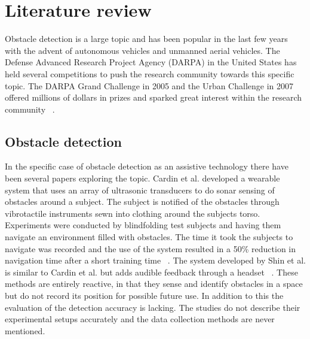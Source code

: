 \documentclass[prodmode,acmtecs]{acmsmall} %
\begin{document}
\section{Literature review}
Obstacle detection is a large topic and has been popular in the last few years with the advent of autonomous vehicles and unmanned aerial vehicles.
The Defense Advanced Research Project Agency (DARPA) in the United States has held several competitions to push the research community towards this specific topic. The DARPA Grand Challenge in 2005 and the Urban Challenge in 2007 offered millions of dollars in prizes and sparked great interest within the research community ~\cite{DARPAGrandChallenge2005,DARPAUrbanChallenge2007}.
\subsection{Obstacle detection}
In the specific case of obstacle detection as an assistive technology there have been several papers exploring the topic. Cardin et al. developed a wearable system that uses an array of ultrasonic transducers to do sonar sensing of obstacles around a subject. The subject is notified of the obstacles through vibrotactile instruments sewn into clothing around the subjects torso. Experiments were conducted by blindfolding test subjects and having them navigate an environment filled with obstacles. The time it took the subjects to navigate was recorded and the use of the system resulted in a 50\% reduction in navigation time after a short training time ~\cite{Cardin2007}. The system developed by Shin et al. is similar to Cardin et al. but adds audible feedback through a headset ~\cite{Shin2007}. These methods are entirely reactive, in that they sense and identify obstacles in a space but do not record its position for possible future use. In addition to this the evaluation of the detection accuracy is lacking. The studies do not describe their experimental setups accurately and the data collection methods are never mentioned. 
\end{document}
